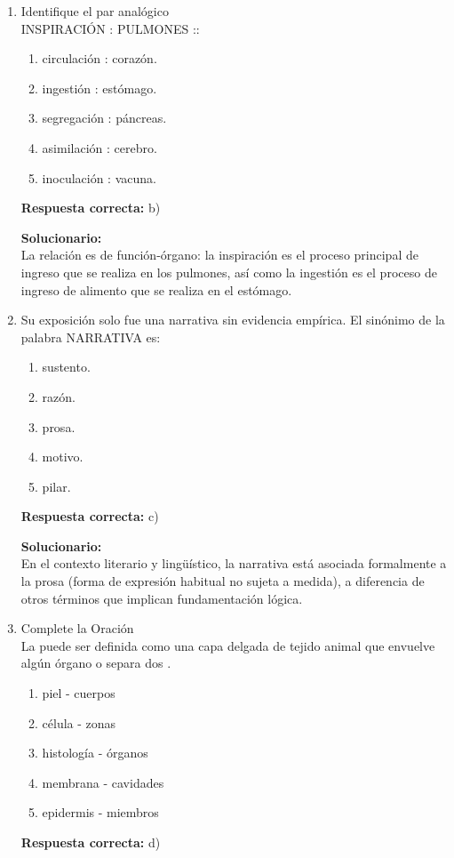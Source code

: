 \begin{enumerate}
	
	\item Identifique el par analógico\\
	INSPIRACIÓN : PULMONES ::
	\begin{enumerate}[label=\alph*)]
		\item circulación : corazón.
		\item ingestión : estómago.
		\item segregación : páncreas.
		\item asimilación : cerebro.
		\item inoculación : vacuna.
	\end{enumerate}
	\textbf{Respuesta correcta:} b)
	
	\vspace{2mm}
	\textbf{Solucionario:}\\
	La relación es de función-órgano: la inspiración es el proceso principal de ingreso que se realiza en los pulmones, así como la ingestión es el proceso de ingreso de alimento que se realiza en el estómago.
	
	\vspace{6mm}
	
	\item Su exposición solo fue una narrativa sin evidencia empírica. El sinónimo de la palabra NARRATIVA es:
	\begin{enumerate}[label=\alph*)]
		\item sustento.
		\item razón.
		\item prosa.
		\item motivo.
		\item pilar.
	\end{enumerate}
	\textbf{Respuesta correcta:} c)
	
	\vspace{2mm}
	\textbf{Solucionario:}\\
	En el contexto literario y lingüístico, la narrativa está asociada formalmente a la prosa (forma de expresión habitual no sujeta a medida), a diferencia de otros términos que implican fundamentación lógica.
	
	\vspace{6mm}
	
	\item Complete la Oración\\
	La \underline{\hspace{2cm}} puede ser definida como una capa delgada de tejido animal que envuelve algún órgano o separa dos \underline{\hspace{2cm}}.
	\begin{enumerate}[label=\alph*)]
		\item piel - cuerpos
		\item célula - zonas
		\item histología - órganos
		\item membrana - cavidades
		\item epidermis - miembros
	\end{enumerate}
	\textbf{Respuesta correcta:} d)
	

\end{enumerate}
